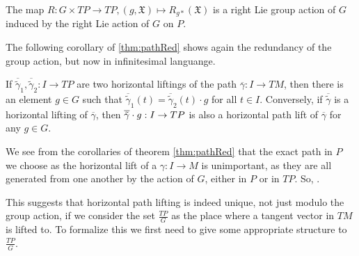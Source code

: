 \begin{proposition}
The map $R : G \times TP \to TP, (g, \mathfrak{X}) \mapsto R_{g*}(\mathfrak X)$ is a right Lie group action of $G$ induced by the right Lie action of $G$ on $P$.
\end{proposition}

The following corollary of \ref{thm:pathRed} shows again the redundancy of the group action, but now in infinitesimal languange.

\begin{corollary}
If $\overline{\tilde{\gamma}}_1, \overline{\tilde{\gamma}}_2: I \to TP$ are two horizontal liftings of the path $\overline{\gamma}:I \to TM$, then there is an element $g \in G$ such that $\overline{\tilde{\gamma}}_1 (t) = \overline{\tilde{\gamma}}_2 (t) \cdot g$ for all $t \in I$. Conversely, if $\overline{\tilde{\gamma}}$ is a horizontal lifting of $\overline{\gamma}$, then $\overline{\Tilde{\gamma}}\cdot g :I \to TP$ is also a horizontal path lift of $\overline{\gamma}$ for any $g\in G$.%
\end{corollary}

We see from the corollaries of theorem \ref{thm:pathRed} that the exact path in $P$ we choose as the horizontal lift of a $\gamma:I \to M$ is unimportant, as they are all generated from one another by the action of $G$, either in $P$ or in $TP$. So, .

This suggests that horizontal path lifting is indeed unique, not just modulo the group action, if we consider the set $\frac{TP}{G}$ as the place where a tangent vector in $TM$ is lifted to. To formalize this we first need to give some appropriate structure to $\frac{TP}{G}$.


